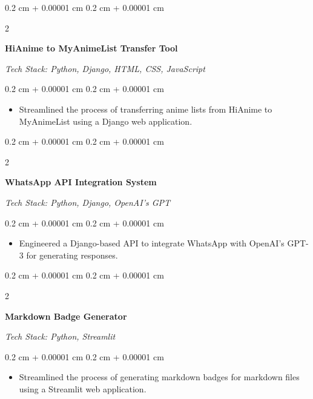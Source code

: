 \documentclass[10pt, a4paper]{article}
\newenvironment{highlights}{
    \begin{itemize}[
        topsep=0.1 cm,
        parsep=0.1 cm,
        partopsep=0pt,
        itemsep=0pt,
        leftmargin=0.4 cm + 10pt
    ]
}{
    \end{itemize}
} %
\newenvironment{onecolentry}{
    \begin{adjustwidth}{
        0.2 cm + 0.00001 cm
    }{
        0.2 cm + 0.00001 cm
    }
}{
    \end{adjustwidth}
} %
\newenvironment{twocolentry}[2][]{
    \onecolentry
    \def\secondColumn{#2}
    \begin{paracol}{2}
}{
    \switchcolumn \raggedleft \secondColumn
    \end{paracol}
    \endonecolentry
} %
\newcommand{\createpointblock}[5]{%
    \begin{twocolentry}{%
        \textit{#2}

        \textit{#4}}
        \textbf{#1}

        \textit{#3}
    \end{twocolentry}

    \vspace{0.1 cm}
    \begin{onecolentry}
        \begin{highlights}
            #5
        \end{highlights}
    \end{onecolentry}
}
\let\hrefWithoutArrow\href
\renewcommand{\href}[2]{\hrefWithoutArrow{#1}{\ifthenelse{\equal{#2}{}}{ }{#2 }\raisebox{.15ex}{\footnotesize \faExternalLink*}}}
\begin{document}
    \vspace{0.2 cm}

    \createpointblock{HiAnime to MyAnimeList Transfer Tool\href{https://github.com/abdxdev/hianime-to-myanimelist}{}}{}
    {Tech Stack: Python, Django, HTML, CSS, JavaScript}{}
    {%
        \item Streamlined the process of transferring anime lists from HiAnime to MyAnimeList using a Django web application.
    }

    \vspace{0.2 cm}



    \createpointblock{WhatsApp API Integration System\href{https://github.com/abdxdev/Whatsapp_API}{}}{}
    {Tech Stack: Python, Django, OpenAI's GPT}{}
    {%
        \item Engineered a Django-based API to integrate WhatsApp with OpenAI's GPT-3 for generating responses.
    }

    \vspace{0.2 cm}

    \createpointblock{Markdown Badge Generator\href{https://github.com/abdxdev/Markdown-badge-generator}{}}{}
    {Tech Stack: Python, Streamlit}{}
    {%
        \item Streamlined the process of generating markdown badges for markdown files using a Streamlit web application.
    }

    \vspace{0.2 cm}



\end{document}
